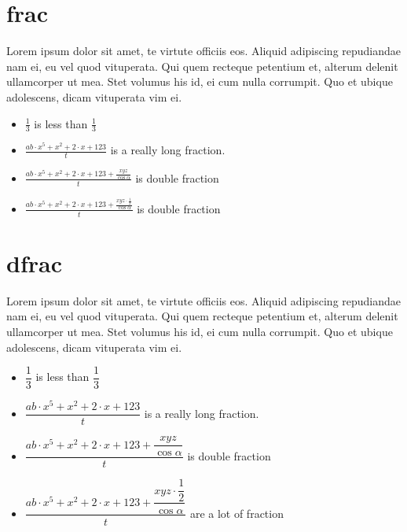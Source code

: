 \documentclass[a4paper,9pt]{scrartcl}
\begin{document}
\section{frac}
Lorem ipsum dolor sit amet, te virtute officiis eos. Aliquid
adipiscing repudiandae nam ei, eu vel quod vituperata. Qui quem
recteque petentium et, alterum delenit ullamcorper ut mea. Stet
volumus his id, ei cum nulla corrumpit. Quo et ubique adolescens,
dicam vituperata vim ei.

    \begin{itemize}
      \item $\frac{1}{3}$ is less than $\frac{1}{3}$
      \item $\frac{ab \cdot x^5 + x^2 + 2 \cdot x + 123}{t}$ is a really long fraction.
      \item $\frac{ab \cdot x^5 + x^2 + 2 \cdot x + 123 + \frac{xyz}{\cos \alpha}}{t}$ is double fraction
      \item $\frac{ab \cdot x^5 + x^2 + 2 \cdot x + 123 + \frac{xyz \cdot \frac{1}{2}}{\cos \alpha}}{t}$ is double fraction
    \end{itemize}

\section{dfrac}
Lorem ipsum dolor sit amet, te virtute officiis eos. Aliquid
adipiscing repudiandae nam ei, eu vel quod vituperata. Qui quem
recteque petentium et, alterum delenit ullamcorper ut mea. Stet
volumus his id, ei cum nulla corrumpit. Quo et ubique adolescens,
dicam vituperata vim ei.

    \begin{itemize}
      \item $\dfrac{1}{3}$ is less than $\dfrac{1}{3}$
      \item $\dfrac{ab \cdot x^5 + x^2 + 2 \cdot x + 123}{t}$ is a really long fraction.
      \item $\dfrac{ab \cdot x^5 + x^2 + 2 \cdot x + 123 + \dfrac{xyz}{\cos \alpha}}{t}$ is double fraction
      \item $\dfrac{ab \cdot x^5 + x^2 + 2 \cdot x + 123 + \dfrac{xyz \cdot \dfrac{1}{2}}{\cos \alpha}}{t}$ are a lot of fraction
    \end{itemize}
\end{document}
